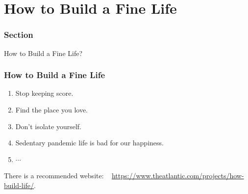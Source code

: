 \documentclass[aspectratio=2516]{beamer}
\begin{document}
\section{How to Build a Fine Life}

\begin{frame}
	\frametitle{ Section \uppercase\expandafter{}}
	
	
	\begin{center}
		\Large How to Build a Fine Life?
	\end{center}
	
\end{frame}

\begin{frame}
	\frametitle{How to Build a Fine Life}
	\begin{enumerate}
		
		\item Stop keeping score.
		
		\vspace{0.5cm}
		
		\item Find the place you love.
		
		\vspace{0.5cm}
		
		\item Don’t isolate yourself.
		
		\vspace{0.5cm}
		
		\item Sedentary pandemic life is bad for our happiness.
		
		\vspace{0.5cm}
		
		\item $ \cdots $
		
	\end{enumerate}

\vspace{0.25cm}

{\tiny There is a recommended website: \ {\color{blue} \url{https://www.theatlantic.com/projects/how-build-life/}}}.
\end{frame}

\end{document}
